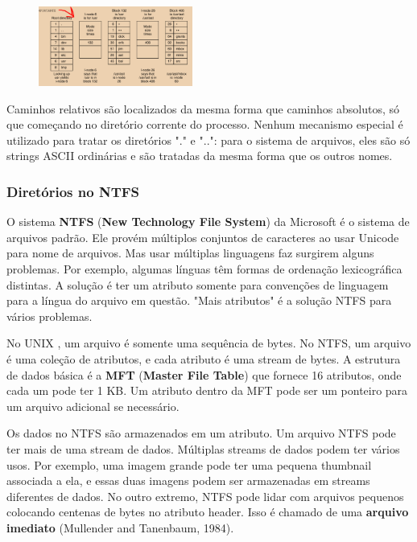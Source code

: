\documentclass{article}
\newcommand\unix{{\color{red}UNIX} }
\begin{document}
\begin{figure}[h]
  \begin{center}
    \includegraphics[width=0.45\textwidth]{img/5-16.png}
  \end{center}
  \caption{}
  \label{fig:}
\end{figure}

Caminhos relativos são localizados da mesma forma que caminhos absolutos, só que começando no diretório corrente do processo. Nenhum mecanismo especial é utilizado para tratar os diretórios "." e "..": para o sistema de arquivos, eles são só strings ASCII ordinárias e são tratadas da mesma forma que os outros nomes.

\subsubsection{Diretórios no NTFS}

O sistema \textbf{NTFS} (\textbf{New Technology File System}) da Microsoft é o sistema de arquivos padrão. Ele provém múltiplos conjuntos de caracteres ao usar Unicode para nome de arquivos. Mas usar múltiplas linguagens faz surgirem alguns problemas. Por exemplo, algumas línguas têm formas de ordenação lexicográfica distintas. A solução é ter um atributo somente para convenções de linguagem para a língua do arquivo em questão. "Mais atributos" é a solução NTFS para vários problemas. 

No \unix, um arquivo é somente uma sequência de bytes. No NTFS, um arquivo é uma coleção de atributos, e cada atributo é uma stream de bytes. A estrutura de dados básica é a \textbf{MFT} (\textbf{Master File Table}) que fornece 16 atributos, onde cada um pode ter 1 KB. Um atributo dentro da MFT pode ser um ponteiro para um arquivo adicional se necessário. 

Os dados no NTFS são armazenados em um atributo. Um arquivo NTFS pode ter mais de uma stream de dados. Múltiplas streams de dados podem ter vários usos. Por exemplo, uma imagem grande pode ter uma pequena thumbnail associada a ela, e essas duas imagens podem ser armazenadas em streams diferentes de dados. No outro extremo, NTFS pode lidar com arquivos pequenos colocando centenas de bytes no atributo header. Isso é chamado de uma \textbf{arquivo imediato} (Mullender and Tanenbaum, 1984).
\end{document}
